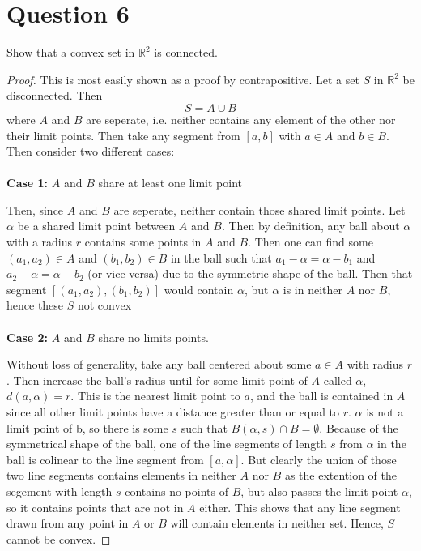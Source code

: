 \documentclass[12pt, letterpaper]{article}
\begin{document}
\section*{Question 6}
Show that a convex set in $\mathbb{R}^2$ is connected.
\begin{proof}
  This is most easily shown as a proof by contrapositive. Let a set $S$ in $\mathbb{R}^2$ be disconnected. Then
  $$ S = A \cup B $$
  where $A$ and $B$ are seperate, i.e. neither contains any element of the other nor their limit points. Then take any segment from $[a, b]$ with $a \in A$ and $b \in B$.
  Then consider two different cases:\\
  \\
  \noindent\textbf{Case 1:} $A$ and $B$ share at least one limit point

  Then, since $A$ and $B$ are seperate, neither contain those shared limit points. Let $\alpha$ be a shared limit point between $A$ and $B$. Then by definition, any ball about $\alpha$ with a radius $r$ contains some points
  in $A$ and $B$. Then one can find some $(a_1, a_2) \in A$ and $(b_1, b_2) \in B$ in the ball such that $a_1 - \alpha = \alpha - b_1$ and $a_2 - \alpha = \alpha - b_2$  (or vice versa) due to the symmetric shape of the ball. Then that segment
  $[(a_1, a_2), (b_1, b_2)]$ would contain $\alpha$, but $\alpha$ is in neither $A$ nor $B$, hence these $S$ not convex\\
  \\
  \noindent\textbf{Case 2:} $A$ and $B$ share no limits points.

  Without loss of generality, take any ball centered about some $a \in A$ with radius $r$. Then increase the ball's radius until for some limit point of $A$ called $\alpha$, $d(a, \alpha) = r$.
  This is the nearest limit point to $a$, and the ball is contained in $A$ since all other limit points have a distance greater than or equal to $r$.
  $\alpha$ is not a limit point of b, so there is some $s$ such that $B(\alpha, s) \cap B = \emptyset$. Because of the symmetrical shape of the ball,
  one of the line segments of length $s$ from $\alpha$ in the ball is colinear to the line segment from $[a, \alpha]$. But clearly the union of those two line segments contains elements in neither $A$ nor $B$ as
  the extention of the segement with length $s$ contains no points of $B$, but also passes the limit point $\alpha$, so it contains points that are not in $A$ either.
  This shows that any line segment drawn from any point in $A$ or $B$ will contain elements in neither set. Hence, $S$ cannot be convex.
\end{proof}
\end{document}
